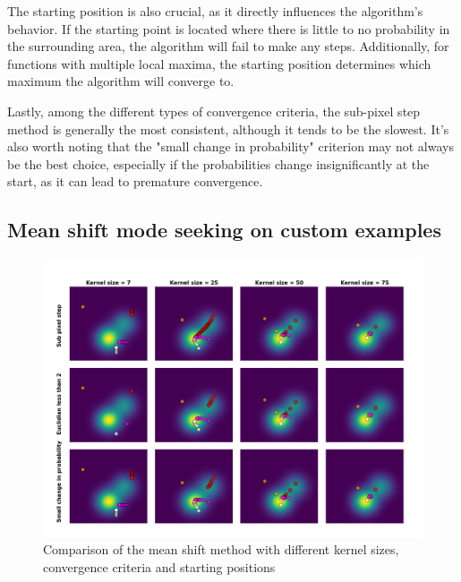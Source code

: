 \documentclass[9pt]{IEEEtran}
\begin{document}
     The starting position is also crucial, as it directly influences the algorithm's
      behavior. If the starting point is located where there is little to no
       probability in the surrounding area, the algorithm will fail to make any 
       steps. Additionally, for functions with multiple local maxima, the starting
        position determines which maximum the algorithm will converge to. 

        Lastly, among the different types of convergence criteria, the sub-pixel 
        step method is generally the most consistent, although it tends to be the
         slowest. It's also worth noting that the "small change in probability" 
         criterion may not always be the best choice, especially if the probabilities 
         change insignificantly at the start, as it can lead to premature convergence.

\subsection{Mean shift mode seeking on custom examples}

\begin{figure}[h]
    \centering
    \includegraphics[width=0.99\columnwidth]{figures/mode_seeking.png}
    \caption{Comparison of the mean shift method with different kernel sizes, convergence
    criteria and starting positions}
    \label{fig:mode_seeking}
\end{figure}




\end{document}
